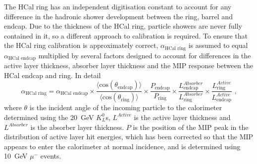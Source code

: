 The HCal ring has an independent digitisation constant to account for any difference in the hadronic shower development between the ring, barrel and endcap.  Due to the thickness of the HCal ring, particle showers are never fully contained in it, so a different approach to calibration is required.  To ensure that the HCal ring calibration is approximately correct, $\alpha_{\text{HCal ring}}$ is assumed to equal $\alpha_{\text{HCal endcap}}$ multiplied by several factors designed to account for differences in the active layer thickness, absorber layer thickness and the MIP response between the HCal endcap and ring.  In detail
%
\begin{equation}
\alpha_{\text{HCal ring}} = \alpha_{\text{HCal endcap}} \times \frac{\langle \text{cos}(\theta_\text{endcap}) \rangle}{\langle \text{cos}(\theta_\text{ring}) \rangle} \times \frac{P_\text{endcap} }{P_\text{ring} } \times \frac{L^{Absorber}_\text{endcap}}{L^{Absorber}_\text{ring} } \times \frac{L^{Active}_\text{ring}}{L^{Active}_\text{endcap}} \text{ ,}
\end{equation}
%
\noindent where $\theta$ is the incident angle of the incoming particle to the calorimeter determined using the 20~GeV $K^{0}_{L}$s, $L^{Active}$ is the active layer thickness and $L^{Absorber}$ is the absorber layer thickness.  $P$ is the position of the MIP peak in the distribution of active layer hit energies, which has been corrected so that the MIP appears to enter the calorimeter at normal incidence, and is determined using 10~GeV $\mu^{-}$ events.


